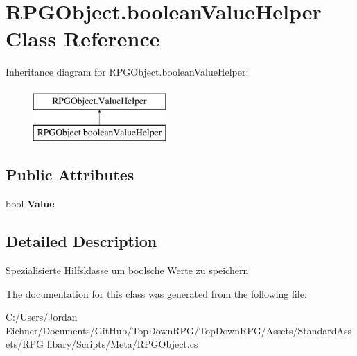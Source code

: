 \hypertarget{class_r_p_g_object_1_1boolean_value_helper}{}\section{R\+P\+G\+Object.\+boolean\+Value\+Helper Class Reference}
\label{class_r_p_g_object_1_1boolean_value_helper}
Inheritance diagram for R\+P\+G\+Object.\+boolean\+Value\+Helper\+:\begin{figure}[H]
\begin{center}
\leavevmode
\includegraphics[height=2.000000cm]{class_r_p_g_object_1_1boolean_value_helper}
\end{center}
\end{figure}
\subsection*{Public Attributes}
\begin{DoxyCompactItemize}
\item 
\hypertarget{class_r_p_g_object_1_1boolean_value_helper_af964a85c583322a703930e4d6c0ba270}{}bool {\bfseries Value}\label{class_r_p_g_object_1_1boolean_value_helper_af964a85c583322a703930e4d6c0ba270}

\end{DoxyCompactItemize}


\subsection{Detailed Description}
Spezialisierte Hilfsklasse um boolsche Werte zu speichern 

The documentation for this class was generated from the following file\+:\begin{DoxyCompactItemize}
\item 
C\+:/\+Users/\+Jordan Eichner/\+Documents/\+Git\+Hub/\+Top\+Down\+R\+P\+G/\+Top\+Down\+R\+P\+G/\+Assets/\+Standard\+Assets/\+R\+P\+G libary/\+Scripts/\+Meta/R\+P\+G\+Object.\+cs\end{DoxyCompactItemize}
